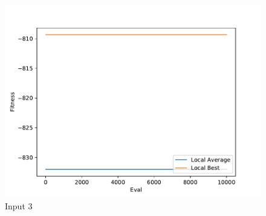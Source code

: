 \documentclass{standalone}
\begin{document}
\begin{figure}[!htb]
	\caption{Input 3}
	\label{fig:graph_3040}
	\includegraphics[width=\textwidth]{../graphs/graphs/3040.pdf}
\end{figure}
\end{document}
